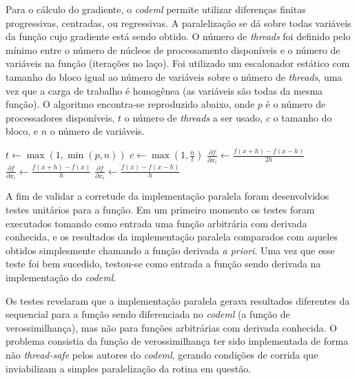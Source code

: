\documentclass[cic,tc]{iiufrgs}
\begin{document}
Para o cálculo do gradiente, o \textit{codeml} permite utilizar diferenças finitas
progressivas, centradas, ou regressivas. A paralelização se dá sobre todas
variáveis da função cujo gradiente está sendo obtido. O número de
\textit{threads} foi definido pelo mínimo entre o número de núcleos de
processamento disponíveis e o número de variáveis na função (iterações no
laço). Foi utilizado um escalonador estático com tamanho do bloco igual ao
número de variáveis sobre o número de \textit{threads}, uma vez que a carga de
trabalho é homogênea (as variáveis são todas da mesma função). O algoritmo
encontra-se reproduzido abaixo, onde $p$ é o número de processadores
disponíveis, $t$ o número de \textit{threads} a ser usado, $c$ o tamanho do
bloco, e $n$ o número de variáveis.

\begin{algorithmic}
\State $t \gets \max(1, \min(p, n))$
\State $c \gets \max(1, \frac{n}{t})$
    \State $\frac{\partial f}{\partial x_i} \gets \frac{f(x+h)-f(x-h)}{2h}$
    \State $\frac{\partial f}{\partial x_i} \gets \frac{f(x+h)-f(x)}{h}$
  \Else
    \State $\frac{\partial f}{\partial x_i} \gets \frac{f(x)-f(x-h)}{h}$
  \EndIf
\EndFor
\end{algorithmic}

A fim de validar a corretude da implementação paralela foram desenvolvidos
testes unitários para a função. Em um primeiro momento os testes foram
executados tomando como entrada uma função arbitrária com derivada conhecida,
e os resultados da implementação paralela comparados com aqueles obtidos
simplesmente chamando a função derivada \textit{a priori}. Uma vez que esse
teste foi bem sucedido, testou-se como entrada a função sendo derivada na
implementação do \textit{codeml}.

Os testes revelaram que a implementação paralela gerava resultados diferentes
da sequencial para a função sendo diferenciada no \textit{codeml} (a função de
verossimilhança), mas não para funções arbitrárias com derivada conhecida. O
problema consistia da função de verossimilhança ter sido implementada de forma
não \textit{thread-safe} pelos autores do \textit{codeml}, gerando condições de corrida
que inviabilizam a simples paralelização da rotina em questão.
\end{document}
